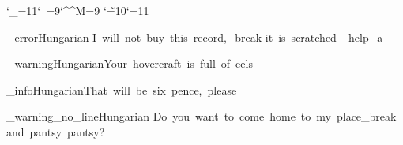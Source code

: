 
\catcode`\_=11\catcode`\ =9\catcode`\^^M=9
\catcode`\~=10\catcode`\@=11

\fontinst_error{Hungarian}{
   I~will~not~buy~this~record,\message_break
   it~is~scratched
}\error_help_a

\fontinst_warning{Hungarian}{Your~hovercraft~is~full~of~eels}

\fontinst_info{Hungarian}{That~will~be~six~pence,~please}

\fontinst_warning_no_line{Hungarian}{
   Do~you~want~to~come~home~to~my~place\message_break
   and~pantsy~pantsy?
}




\bye